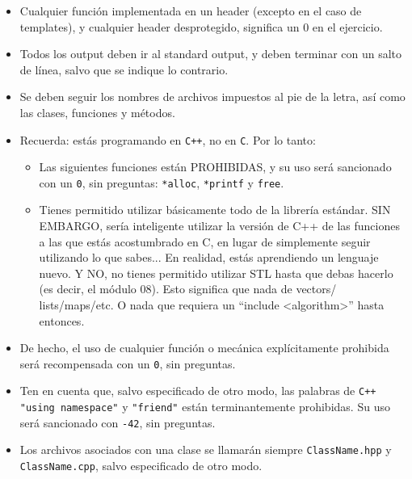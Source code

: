 \begin{itemize}
  \item Cualquier función implementada en un header (excepto en el caso de
    templates), y cualquier header desprotegido, significa un 0 en el ejercicio.

  \item Todos los output deben ir al standard output, y deben terminar con
    un salto de línea, salvo que se indique lo contrario.

  \item Se deben seguir los nombres de archivos impuestos al pie de la letra,
    así como las clases, funciones y métodos.

  \item Recuerda: estás programando en \texttt{C++}, no en \texttt{C}.
    Por lo tanto:

	\begin{itemize}
    \item Las siguientes funciones están PROHIBIDAS, y su uso será sancionado
      con un \texttt{0}, sin preguntas: \texttt{*alloc}, \texttt{*printf} y
      \texttt{free}.

    \item Tienes permitido utilizar básicamente todo de la librería estándar.
      SIN EMBARGO, sería inteligente utilizar la versión de C++ de las
      funciones a las que estás acostumbrado en C, en lugar de simplemente
      seguir utilizando lo que sabes... En realidad, estás aprendiendo un
      lenguaje nuevo. Y NO, no tienes permitido utilizar STL hasta que debas
      hacerlo (es decir, el módulo 08). Esto significa que nada de vectors/
      lists/maps/etc. O nada que requiera un ``include <algorithm>''
      hasta entonces.
  \end{itemize}

  \item De hecho, el uso de cualquier función o mecánica explícitamente
    prohibida será recompensada con un \texttt{0}, sin preguntas.

  \item Ten en cuenta que, salvo especificado de otro modo, las palabras de
    \texttt{C++} \texttt{"using namespace"} y \texttt{"friend"} están
    terminantemente prohibidas. Su uso será sancionado con \texttt{-42},
    sin preguntas.

  \item Los archivos asociados con una clase se llamarán siempre
    \texttt{ClassName.hpp} y \texttt{ClassName.cpp}, salvo especificado
    de otro modo.


\end{itemize}
